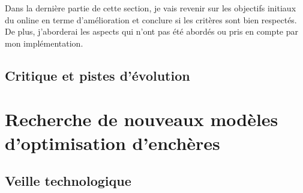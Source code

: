         Dans la dernière partie de cette section, je vais revenir sur les objectifs initiaux du \bo online en terme d'amélioration et conclure si les critères sont bien respectés. De plus, j'aborderai les aspects qui n'ont pas été abordés ou pris en compte par mon implémentation.
       
    \subsection{Critique et pistes d'évolution}
        
    
\section{Recherche de nouveaux modèles d'optimisation d'enchères}
    \subsection{Veille technologique}
